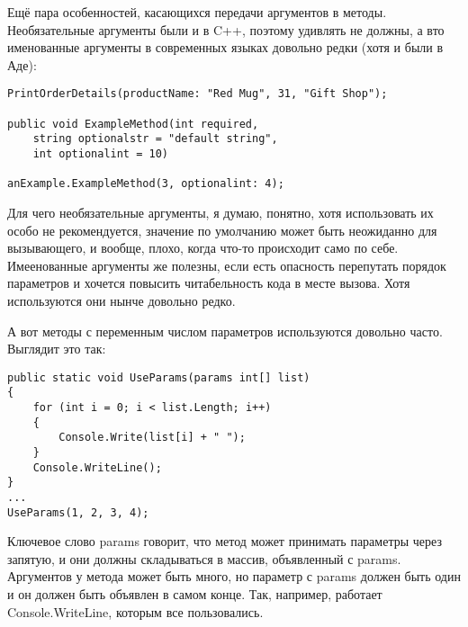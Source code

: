 \documentclass[a5paper]{article}
\begin{document}
Ещё пара особенностей, касающихся передачи аргументов в методы. Необязательные аргументы были и в C++, поэтому удивлять не должны, а вто именованные аргументы в современных языках довольно редки (хотя и были в Аде):

\begin{verbatim}
PrintOrderDetails(productName: "Red Mug", 31, "Gift Shop");

public void ExampleMethod(int required, 
    string optionalstr = "default string",
    int optionalint = 10)

anExample.ExampleMethod(3, optionalint: 4);
\end{verbatim}

Для чего необязательные аргументы, я думаю, понятно, хотя использовать их особо не рекомендуется, значение по умолчанию может быть неожиданно для вызывающего, и вообще, плохо, когда что-то происходит само по себе. Имеенованные аргументы же полезны, если есть опасность перепутать порядок параметров и хочется повысить читабельность кода в месте вызова. Хотя используются они нынче довольно редко.

А вот методы с переменным числом параметров используются довольно часто. Выглядит это так:

\begin{verbatim}
public static void UseParams(params int[] list)
{
    for (int i = 0; i < list.Length; i++)
    {
        Console.Write(list[i] + " ");
    }
    Console.WriteLine();
}
...
UseParams(1, 2, 3, 4);
\end{verbatim}

Ключевое слово params говорит, что метод может принимать параметры через запятую, и они должны складываться в массив, объявленный с params. Аргументов у метода может быть много, но параметр с params должен быть один и он должен быть объявлен в самом конце. Так, например, работает Console.WriteLine, которым все пользовались.
\end{document}
